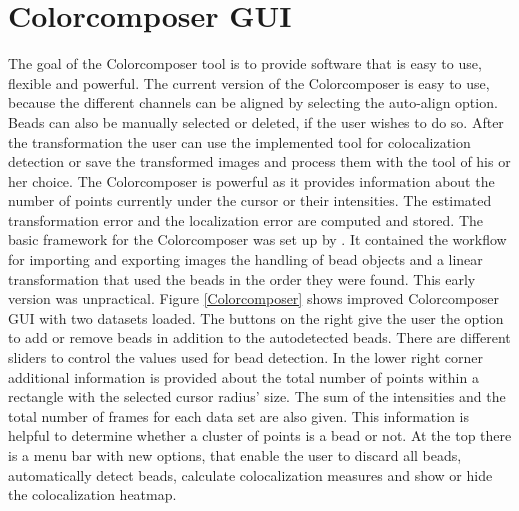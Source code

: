 \section{Colorcomposer GUI}
The goal of the Colorcomposer tool is to provide software that is easy to use, flexible and powerful. The current version of the Colorcomposer is easy to use, because the different channels can be aligned by selecting the auto-align option.\newline
Beads can also be manually selected or deleted, if the user wishes to do so. After the transformation the user can use the implemented tool for colocalization detection or save the transformed images and process them with the tool of his or her choice.\newline
The Colorcomposer is powerful as it provides information about the number of points currently under the cursor or their intensities. The estimated transformation error and the localization error are computed and stored.\newline
The basic framework for the Colorcomposer was set up by \cite{MAJoachim}. It contained the workflow for importing and exporting images the handling of bead objects and a linear transformation that used the beads in the order they were found. This early version was unpractical.\newline
Figure \ref{Colorcomposer} shows improved Colorcomposer GUI with two datasets loaded. The buttons on the right give the user the option to add or remove beads in addition to the autodetected beads. There are different sliders to control the values used for bead detection. In the lower right corner additional information is provided about the total number of points within a rectangle with the selected cursor radius' size. The sum of the intensities and the total number of frames for each data set are also given. This information is helpful to determine whether a cluster of points is a bead or not.\newline
At the top there is a menu bar with new options, that enable the user to discard all beads, automatically detect beads, calculate colocalization measures and show or hide the colocalization heatmap.
